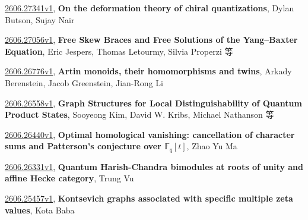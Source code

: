 \documentclass[9pt, a4paper]{article}
\theoremstyle{plain}
\theoremstyle{definition}
\theoremstyle{remark}
\newcommand{\arxiv}[3]{\href{https://arxiv.org/abs/#1}{#1}, \textbf{\textcolor{arxivblue}{#2}}, #3}
\begin{document}
\arxiv{2606.27341v1}{On the deformation theory of chiral quantizations}{Dylan Butson, Sujay Nair}

\arxiv{2606.27056v1}{Free Skew Braces and Free Solutions of the Yang--Baxter Equation}{Eric Jespers, Thomas Letourmy, Silvia Properzi 等}

\arxiv{2606.26776v1}{Artin monoids, their homomorphisms and twins}{Arkady Berenstein, Jacob Greenstein, Jian-Rong Li}

\arxiv{2606.26558v1}{Graph Structures for Local Distinguishability of Quantum Product States}{Sooyeong Kim, David W. Kribs, Michael Nathanson 等}

\arxiv{2606.26440v1}{Optimal homological vanishing: cancellation of character sums and Patterson's conjecture over $\mathbb{F}_q[t]$}{Zhao Yu Ma}

\arxiv{2606.26331v1}{Quantum Harish-Chandra bimodules at roots of unity and affine Hecke category}{Trung Vu}

\arxiv{2606.25457v1}{Kontsevich graphs associated with specific multiple zeta values}{Kota Baba}

\end{document}
